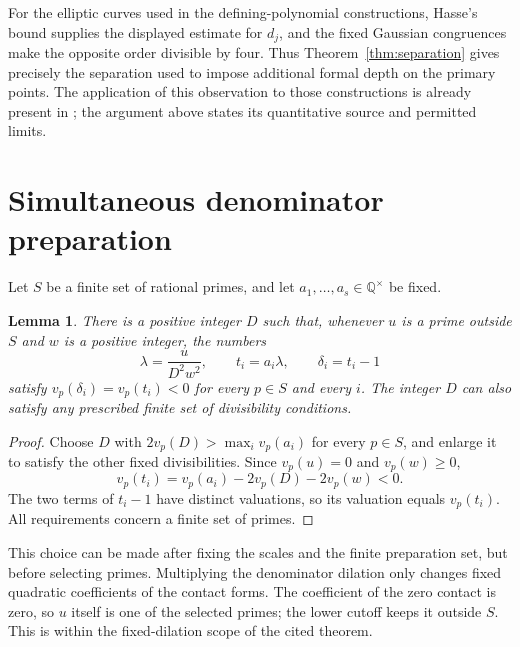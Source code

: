 \documentclass[11pt,a4paper]{article}
\newtheorem{lemma}[theorem]{Lemma}
\theoremstyle{remark}\newtheorem{remark}[theorem]{Remark}
\newcommand{\Q}{\mathbb Q}\newcommand{\Z}{\mathbb Z}
\begin{document}
For the elliptic curves used in the defining-polynomial constructions,
Hasse's bound supplies the displayed estimate for $d_j$, and the fixed
Gaussian congruences make the opposite order divisible by four.
Thus Theorem~\ref{thm:separation} gives precisely the separation used
to impose additional formal depth on the primary points.
The application of this observation to those constructions is already
present in \cite[Version 9 separation subsection]{Upstream}; the
argument above states its quantitative source and permitted limits.

\section{Simultaneous denominator preparation}
Let $S$ be a finite set of rational primes, and let
$a_1,\ldots,a_s\in\Q^\times$ be fixed.

\begin{lemma}\label{lem:denominator}
There is a positive integer $D$ such that, whenever $u$ is a prime
outside $S$ and $w$ is a positive integer, the numbers
\[
 \lambda=\frac{u}{D^2w^2},\qquad t_i=a_i\lambda,
 \qquad\delta_i=t_i-1
\]
satisfy $v_p(\delta_i)=v_p(t_i)<0$ for every $p\in S$ and every $i$.
The integer $D$ can also satisfy any prescribed finite set of
divisibility conditions.
\end{lemma}
\begin{proof}
Choose $D$ with $2v_p(D)>\max_i v_p(a_i)$ for every $p\in S$,
and enlarge it to satisfy the other fixed divisibilities. Since
$v_p(u)=0$ and $v_p(w)\ge0$,
\[
 v_p(t_i)=v_p(a_i)-2v_p(D)-2v_p(w)<0.
\]
The two terms of $t_i-1$ have distinct valuations, so its valuation
equals $v_p(t_i)$. All requirements concern a finite set of primes.
\end{proof}

This choice can be made after fixing the scales and the finite
preparation set, but before selecting primes. Multiplying the
denominator dilation only changes fixed quadratic coefficients of the
contact forms. The coefficient of the zero contact is zero, so $u$
itself is one of the selected primes; the lower cutoff keeps it outside
$S$. This is within the fixed-dilation scope of the cited theorem.
\end{document}
